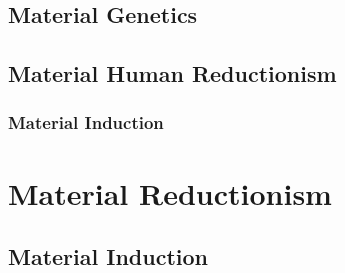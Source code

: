 \documentclass[UTF8]{article}
\begin{document}
	\subsection{Material Genetics}
	\subsection{Material Human Reductionism}
	\subsubsection{Material Induction}
	
	\section{Material Reductionism}
	\subsection{Material Induction}
	
\end{document}

